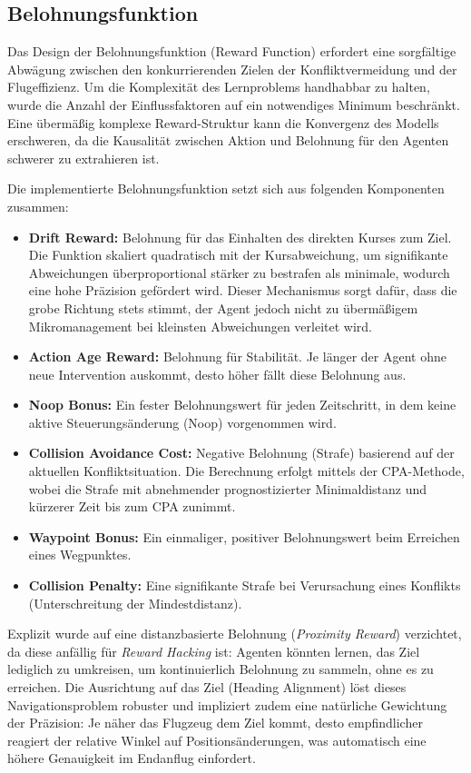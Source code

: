 \subsection{Belohnungsfunktion}
Das Design der Belohnungsfunktion (Reward Function) erfordert eine sorgfältige Abwägung zwischen den konkurrierenden Zielen der Konfliktvermeidung und der Flugeffizienz.
Um die Komplexität des Lernproblems handhabbar zu halten, wurde die Anzahl der Einflussfaktoren auf ein notwendiges Minimum beschränkt.
Eine übermäßig komplexe Reward\hyp{}Struktur kann die Konvergenz des Modells erschweren, da die Kausalität zwischen Aktion und Belohnung für den Agenten schwerer zu extrahieren ist.
\medskip

Die implementierte Belohnungsfunktion setzt sich aus folgenden Komponenten zusammen:
\begin{itemize}
    \item \textbf{Drift Reward:} Belohnung für das Einhalten des direkten Kurses zum Ziel. Die Funktion skaliert quadratisch mit der Kursabweichung, um signifikante Abweichungen überproportional stärker zu bestrafen als minimale, wodurch eine hohe Präzision gefördert wird. Dieser Mechanismus sorgt dafür, dass die grobe Richtung stets stimmt, der Agent jedoch nicht zu übermäßigem Mikromanagement bei kleinsten Abweichungen verleitet wird.
    \item \textbf{Action Age Reward:} Belohnung für Stabilität. Je länger der Agent ohne neue Intervention auskommt, desto höher fällt diese Belohnung aus.
    \item \textbf{Noop Bonus:} Ein fester Belohnungswert für jeden Zeitschritt, in dem keine aktive Steuerungsänderung (Noop) vorgenommen wird.
    \item \textbf{Collision Avoidance Cost:} Negative Belohnung (Strafe) basierend auf der aktuellen Konfliktsituation. Die Berechnung erfolgt mittels der \ac{CPA}\hyp{}Methode, wobei die Strafe mit abnehmender prognostizierter Minimaldistanz und kürzerer Zeit bis zum \ac{CPA} zunimmt.
    \item \textbf{Waypoint Bonus:} Ein einmaliger, positiver Belohnungswert beim Erreichen eines Wegpunktes.
    \item \textbf{Collision Penalty:} Eine signifikante Strafe bei Verursachung eines Konflikts (Unterschreitung der Mindestdistanz).
\end{itemize}

Explizit wurde auf eine distanzbasierte Belohnung (\textit{Proximity Reward}) verzichtet, da diese anfällig für \textit{Reward Hacking} ist: Agenten könnten lernen, das Ziel lediglich zu umkreisen, um kontinuierlich Belohnung zu sammeln, ohne es zu erreichen. Die Ausrichtung auf das Ziel (Heading Alignment) löst dieses Navigationsproblem robuster und impliziert zudem eine natürliche Gewichtung der Präzision: Je näher das Flugzeug dem Ziel kommt, desto empfindlicher reagiert der relative Winkel auf Positionsänderungen, was automatisch eine höhere Genauigkeit im Endanflug einfordert.
\medskip

